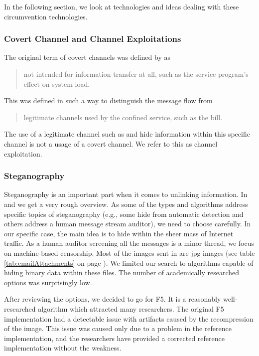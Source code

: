 In the following section, we look at technologies and ideas dealing with these circumvention technologies.

\subsubsection{Covert Channel and Channel Exploitations}
The original term of covert channels was defined by \citeauthor{Lampson73anote}\cite{Lampson73anote} as 

\begin{quote}
	not intended for information transfer at all, such as the service program's effect on system load.
\end{quote}

This was defined  in such a way to distinguish the message flow from 

\begin{quote}
	legitimate channels used by the confined service, such as the bill.
\end{quote}

The use of a legitimate channel such as  and hide information within this specific channel is not a usage of a covert channel. We refer to this as channel exploitation.

\subsubsection{Steganography}

Steganography is an important part when it comes to unlinking information. In \cite{6828087} and \cite{subhedar2014current} we get a very rough overview. As some of the types and algorithms address specific topics of steganography (e.g., some hide from automatic detection and others address a human message stream auditor), we need to choose carefully. In our specific case, the main idea is to hide within the sheer mass of Internet traffic. As a human auditor screening all the messages is a minor thread, we focus on machine-based censorship. Most of the images sent in  are jpg images (see table \ref{tab:emailAttachments} on page \pageref{tab:emailAttachments}). We limited our search to algorithms capable of hiding binary data within these files. The number of academically researched options was surprisingly low.

After reviewing the options, we decided to go for F5\cite{f5}. It is a reasonably well-researched algorithm which attracted many researchers. The original F5 implementation had a detectable issue with artifacts\cite{F5broken} caused by the recompression of the image. This issue was caused only due to a problem in the reference implementation, and the researchers have provided a corrected reference implementation without the weakness.

